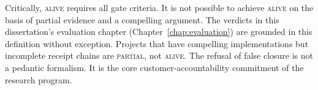 Critically, \textsc{alive} requires all gate criteria. It is not possible to achieve \textsc{alive} on the basis of partial evidence and a compelling argument. The verdicts in this dissertation's evaluation chapter (Chapter~\ref{chap:evaluation}) are grounded in this definition without exception. Projects that have compelling implementations but incomplete receipt chains are \textsc{partial}, not \textsc{alive}. The refusal of false closure is not a pedantic formalism. It is the core customer-accountability commitment of the research program.
